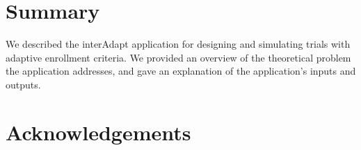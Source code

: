\documentclass{article}
\newcommand{\interAdapt}{\textsf{interAdapt }}
\begin{document}
\section*{Summary}

We described the \interAdapt application for designing and simulating trials with adaptive enrollment criteria. We provided an overview of the theoretical problem the application addresses, and gave an explanation of the application’s inputs and outputs.



\section*{Acknowledgements}






\end{document}
